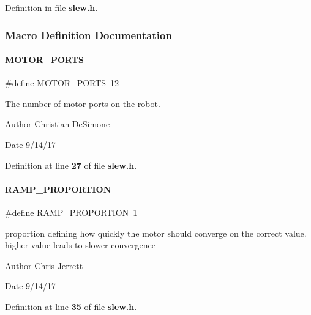 Definition in file \textbf{ slew.\+h}.



\subsubsection{Macro Definition Documentation}
\mbox{\label{slew_8h_ad1ad4b29af4180aa00713599367fbc98}} 
\paragraph{M\+O\+T\+O\+R\+\_\+\+P\+O\+R\+TS}
{\footnotesize\ttfamily \#define M\+O\+T\+O\+R\+\_\+\+P\+O\+R\+TS~12}



The number of motor ports on the robot. 

\begin{DoxyAuthor}{Author}
Christian De\+Simone 
\end{DoxyAuthor}
\begin{DoxyDate}{Date}
9/14/17 
\end{DoxyDate}


Definition at line \textbf{ 27} of file \textbf{ slew.\+h}.

\mbox{\label{slew_8h_a4a3ff8667251227c99f8f4c81e9ff467}} 
\paragraph{R\+A\+M\+P\+\_\+\+P\+R\+O\+P\+O\+R\+T\+I\+ON}
{\footnotesize\ttfamily \#define R\+A\+M\+P\+\_\+\+P\+R\+O\+P\+O\+R\+T\+I\+ON~1}



proportion defining how quickly the motor should converge on the correct value. higher value leads to slower convergence 

\begin{DoxyAuthor}{Author}
Chris Jerrett 
\end{DoxyAuthor}
\begin{DoxyDate}{Date}
9/14/17 
\end{DoxyDate}


Definition at line \textbf{ 35} of file \textbf{ slew.\+h}.

